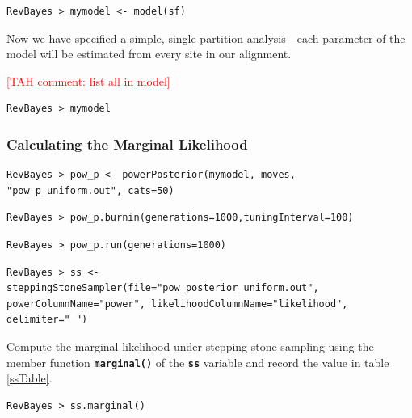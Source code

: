 \documentclass[11pt]{article}
\newcommand{\taha}[1]{{\textcolor{red}{[TAH comment: #1]}}} %
\newcommand{\cl}[1]{{\texttt{\textbf{#1}}}}
\begin{document}
{\tt \begin{snugshade*}
\begin{lstlisting}
RevBayes > mymodel <- model(sf)
\end{lstlisting}
\end{snugshade*}}

Now we have specified a simple, single-partition analysis---each parameter of the model will be estimated from every site in our alignment.

\taha{list all in model}
{\tt \begin{snugshade*}
\begin{lstlisting}
RevBayes > mymodel
\end{lstlisting}
\end{snugshade*}}


\subsubsection*{Calculating the Marginal Likelihood}

{\tt \begin{snugshade*}
\begin{lstlisting}
RevBayes > pow_p <- powerPosterior(mymodel, moves, "pow_p_uniform.out", cats=50) 
\end{lstlisting}
\end{snugshade*}}

{\tt \begin{snugshade*}
\begin{lstlisting}
RevBayes > pow_p.burnin(generations=1000,tuningInterval=100)
\end{lstlisting}
\end{snugshade*}}

{\tt \begin{snugshade*}
\begin{lstlisting}
RevBayes > pow_p.run(generations=1000)  
\end{lstlisting}
\end{snugshade*}}

{\tt \small \begin{snugshade*}
\begin{lstlisting}
RevBayes > ss <- steppingStoneSampler(file="pow_posterior_uniform.out", powerColumnName="power", likelihoodColumnName="likelihood", delimiter="	")
\end{lstlisting}
\end{snugshade*}}

Compute the marginal likelihood under stepping-stone sampling using the member function \cl{marginal()} of the \cl{ss} variable and record the value in table \ref{ssTable}.
{\tt \begin{snugshade*}
\begin{lstlisting}
RevBayes > ss.marginal() 
\end{lstlisting}
\end{snugshade*}}
\end{document}
